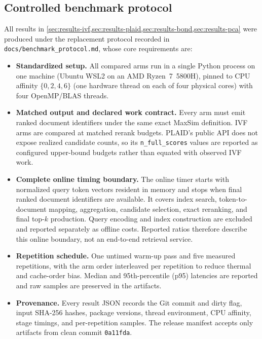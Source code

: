 \subsection{Controlled benchmark protocol}
\label{sec:protocol}

All results in \cref{sec:results-ivf,sec:results-plaid,sec:results-bond,sec:results-pca} were
produced under the replacement protocol recorded in\\
\texttt{docs/benchmark\_protocol.md}, whose core requirements are:

\begin{itemize}[noitemsep]
  \item \textbf{Standardized setup.} All compared arms run in a single
    Python process on one machine (Ubuntu WSL2 on an AMD Ryzen~7~5800H),
    pinned to CPU affinity $\{0, 2, 4, 6\}$ (one hardware thread on each of
    four physical cores) with four OpenMP/BLAS threads.
  \item \textbf{Matched output and declared work contract.} Every arm must
    emit ranked document identifiers under the same exact MaxSim definition.
    IVF arms are compared at matched rerank budgets. PLAID's public API does
    not expose realized candidate counts, so its \texttt{n\_full\_scores}
    values are reported as configured upper-bound budgets rather than equated
    with observed IVF work.
  \item \textbf{Complete online timing boundary.} The online timer starts with
    normalized query token vectors resident in memory and stops when final
    ranked document identifiers are available. It covers index search,
    token-to-document mapping, aggregation, candidate selection, exact
    reranking, and final top-$k$ production. Query encoding and index
    construction are excluded and reported separately as offline costs.
    Reported ratios therefore describe this online boundary, not an
    end-to-end retrieval service.
  \item \textbf{Repetition schedule.} One untimed warm-up pass and five
    measured repetitions, with the arm order interleaved per repetition to
    reduce thermal and cache-order bias. Median and 95th-percentile (p95)
    latencies are reported and raw samples are preserved in the artifacts.
  \item \textbf{Provenance.} Every result JSON records the Git commit and
    dirty flag, input SHA-256 hashes, package versions, thread environment,
    CPU affinity, stage timings, and per-repetition samples. The release
    manifest accepts only artifacts from clean commit \texttt{0a11fda}.
\end{itemize}

